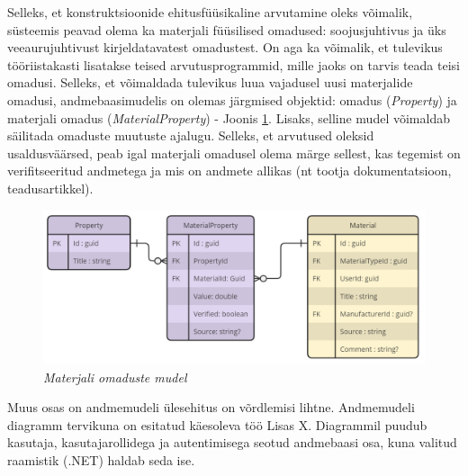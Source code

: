 Selleks, et konstruktsioonide ehitusfüüsikaline arvutamine oleks võimalik, süsteemis peavad olema ka 
materjali füüsilised omadused: soojusjuhtivus ja üks veeaurujuhtivust kirjeldatavatest omadustest. On 
aga ka võimalik, et tulevikus tööriistakasti lisatakse teised arvutusprogrammid, mille jaoks on tarvis teada
teisi omadusi. Selleks, et võimaldada tulevikus luua vajadusel uusi materjalide omadusi, andmebaasimudelis
on olemas järgmised objektid: omadus (\textit{Property}) ja materjali omadus (\textit{MaterialProperty}) - Joonis 
\ref{fig:db_properties_model}. Lisaks, selline mudel võimaldab säilitada omaduste muutuste ajalugu.
Selleks, et arvutused oleksid usaldusväärsed, peab igal materjali omadusel olema märge sellest, kas 
tegemist on verifitseeritud andmetega ja mis on andmete allikas (nt tootja dokumentatsioon, teadusartikkel).

\begin{figure}[ht]
    \centering
    \includegraphics[width=.8\textwidth]{figures/analysis/db_desing_2.png}
    \caption[Materjali omaduste mudel]{\textit{Materjali omaduste mudel}}
    \label{fig:db_properties_model}
\end{figure}

Muus osas on andmemudeli ülesehitus on võrdlemisi lihtne. Andmemudeli diagramm tervikuna on esitatud käesoleva töö Lisas X.
Diagrammil puudub kasutaja, kasutajarollidega ja autentimisega seotud andmebaasi osa, kuna valitud raamistik (.NET) haldab
seda ise.